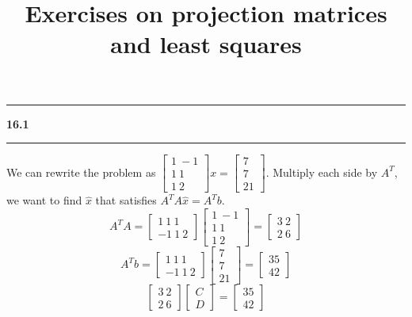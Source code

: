 \documentclass[11pt]{article}
\newcommand\question[2]{\vspace{.25in}\hrule\textbf{#1 #2}\vspace{.5em}\hrule\vspace{.10in}}
\begin{document}
\raggedright
\newcommand\NAME{Haiying Cui}  %
\newcommand\ANDREWID{Christy}     %
\newcommand\HWNUM{16}              %

\title{Exercises on projection matrices and least squares}
\maketitle

\question{16.1}{}
We can rewrite the problem as \(\begin{bmatrix} 1 \ -1 \\ 1 \ 1 \\ 1 \ 2 \end{bmatrix}x = \begin{bmatrix}7 \\ 7 \\ 21 \end{bmatrix}\). Multiply each side by \(A^T\), we want to find \(\hat{x}\) that satisfies \(A^TA\hat{x} = A^Tb\).
$$A^TA = \begin{bmatrix} 1 \ 1 \ 1 \\ -1 \ 1 \ 2 \end{bmatrix}\begin{bmatrix} 1 \ -1 \\ 1 \ 1 \\ 1 \ 2 \end{bmatrix} = \begin{bmatrix} 3 \ 2 \\ 2 \ 6 \end{bmatrix}$$
$$A^Tb = \begin{bmatrix} 1 \ 1 \ 1 \\ -1 \ 1 \ 2 \end{bmatrix}\begin{bmatrix} 7 \\ 7 \\ 21 \end{bmatrix} = \begin{bmatrix} 35 \\ 42 \end{bmatrix}$$
$$\begin{bmatrix} 3 \ 2 \\ 2 \ 6 \end{bmatrix}\begin{bmatrix} C \\ D \end{bmatrix} = \begin{bmatrix} 35 \\ 42 \end{bmatrix}$$
\end{document}
